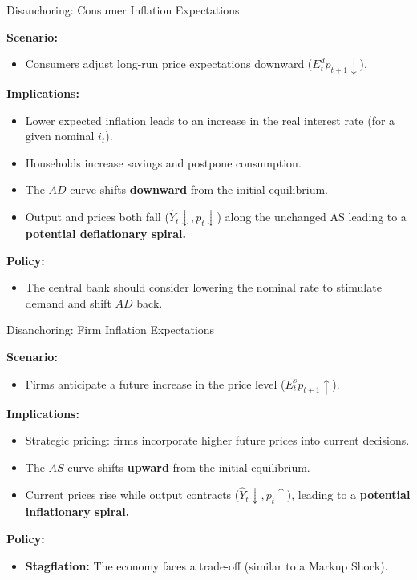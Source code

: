 \documentclass[11pt,aspectratio=169]{beamer}
\begin{document}
\begin{frame}[label=ExpDemand]{Disanchoring: Consumer Inflation Expectations}
\small

\textbf{Scenario:}
\begin{itemize}
    \item Consumers adjust long-run price expectations downward ($E_{t}^{d}p_{t+1} \downarrow$).
\end{itemize}

\textbf{Implications:}
\begin{itemize}
    \item Lower expected inflation leads to an increase in the real interest rate (for a given nominal $i_t$).
    \item Households increase savings and postpone consumption.
    \item The $AD$ curve shifts \textbf{downward} from the initial equilibrium.
    \item Output and prices both fall ($\hat{Y}_t \downarrow, p_t \downarrow$) along the unchanged AS leading to a \textbf{potential deflationary spiral.}
\end{itemize}
\vspace{0.3em}
\textbf{Policy:}
\begin{itemize}
    \item The central bank should consider lowering the nominal rate to stimulate demand and shift $AD$ back.
\end{itemize}
\end{frame}
\begin{frame}[label=ExpSupply]{Disanchoring: Firm Inflation Expectations}
\small

\textbf{Scenario:}
\begin{itemize}
    \item Firms anticipate a future increase in the price level ($E_{t}^{s}p_{t+1} \uparrow$).
\end{itemize}

\textbf{Implications:}
\begin{itemize}
    \item Strategic pricing: firms incorporate higher future prices into current decisions.
    \item The $AS$ curve shifts \textbf{upward} from the initial equilibrium.
    \item Current prices rise while output contracts ($\hat{Y}_t \downarrow, p_t \uparrow$), leading to a \textbf{potential inflationary spiral.}
\end{itemize}
\vspace{0.3em}
\textbf{Policy:}
\begin{itemize}
    \item \textbf{Stagflation:} The economy faces a trade-off (similar to a Markup Shock).
\end{itemize}
\end{frame}
\end{document}
